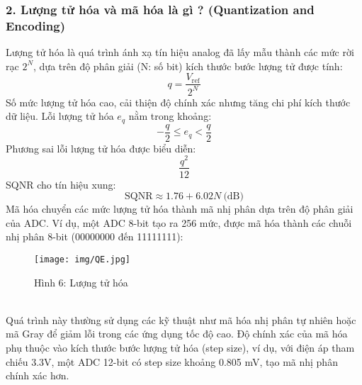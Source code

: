 \documentclass[a4paper,13pt]{article}
\begin{document}
\subsubsection*{2. Lượng tử hóa và mã hóa là gì ? (Quantization and Encoding)}
Lượng tử hóa là quá trình ánh xạ tín hiệu analog đã lấy mẫu thành các mức rời rạc \(2^N\), dựa trên độ phân giải (N: số bit) kích thước bước lượng tử được tính: 
\[
        q = \frac{V_{\text{ref}}}{2^N} \tag{2}
\]
Số mức lượng tử hóa cao, cải thiện độ chính xác nhưng tăng chi phí kích thước dữ liệu. Lỗi lượng tử hóa \(e_q\) nằm trong khoảng:
\[
        -\frac{q}{2} \le e_q < \frac{q}{2} \tag{3}
\]
Phương sai lỗi lượng tử hóa được biểu diễn: 
\[
        \frac{q^2}{12} \tag{4}
\]
SQNR cho tín hiệu xung:
\[
\text{SQNR} \approx 1.76 + 6.02N\ \text{(dB)} \tag{5}
\]
Mã hóa chuyển các mức lượng tử hóa thành mã nhị phân dựa trên độ phân giải của ADC. Ví dụ, một ADC 8-bit tạo ra 256 mức, được mã hóa thành các chuỗi nhị phân 8-bit (00000000 đến 11111111): \\
\begin{figure}[htbp]
    \centering
    \texttt{[image: img/QE.jpg]}
    \caption*{Hình 6: Lượng tử hóa \cite{key8} }
    \label{fig:model}
\end{figure}\\
Quá trình này thường sử dụng các kỹ thuật như mã hóa nhị phân tự nhiên hoặc mã Gray để giảm lỗi trong các ứng dụng tốc độ cao. Độ chính xác của mã hóa phụ thuộc vào kích thước bước lượng tử hóa (step size), ví dụ, với điện áp tham chiếu 3.3V, một ADC 12-bit có step size khoảng 0.805 mV, tạo mã nhị phân chính xác hơn.
\end{document}
